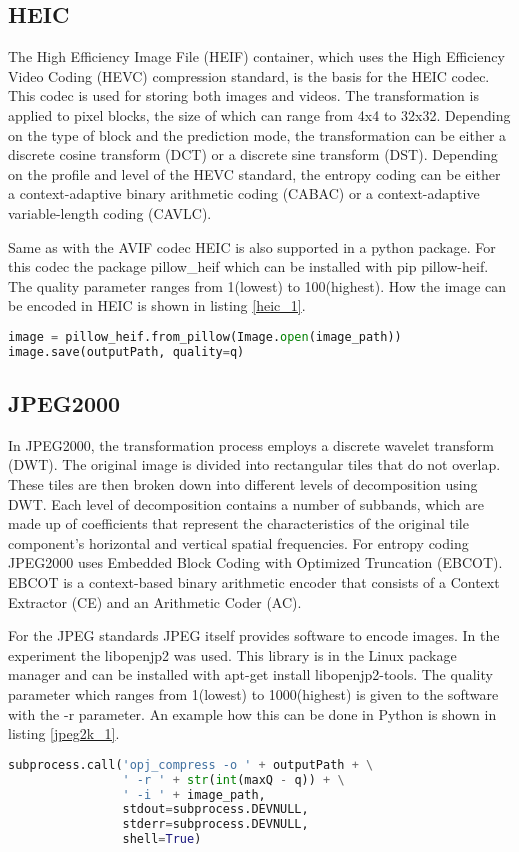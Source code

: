 \subsection{HEIC}
The High Efficiency Image File (HEIF) container, which uses the High Efficiency Video Coding (HEVC) compression standard, is the basis for the HEIC codec. This codec is used for storing both images and videos.
The transformation is applied to pixel blocks, the size of which can range from 4x4 to 32x32. Depending on the type of block and the prediction mode, the transformation can be either a discrete cosine transform (DCT) or a discrete sine transform (DST).
Depending on the profile and level of the HEVC standard, the entropy coding can be either a context-adaptive binary arithmetic coding (CABAC) or a context-adaptive variable-length coding (CAVLC).

Same as with the AVIF codec HEIC is also supported in a python package. For this codec the package pillow\_heif which can be installed with pip pillow-heif. The quality parameter ranges from 1(lowest) to 100(highest).
How the image can be encoded in HEIC is shown in listing \ref{heic_1}.

\begin{lstlisting}[label={heic_1}, language=Python, caption=Encode HEIC]
image = pillow_heif.from_pillow(Image.open(image_path))
image.save(outputPath, quality=q)
\end{lstlisting}

\subsection{JPEG2000}
In JPEG2000, the transformation process employs a discrete wavelet transform (DWT). The original image is divided into rectangular tiles that do not overlap. These tiles are then broken down into different levels of decomposition using DWT. Each level of decomposition contains a number of subbands, which are made up of coefficients that represent the characteristics of the original tile component’s horizontal and vertical spatial frequencies.
For entropy coding JPEG2000 uses Embedded Block Coding with Optimized Truncation (EBCOT). EBCOT is a context-based binary arithmetic encoder that consists of a Context Extractor (CE) and an Arithmetic Coder (AC).

For the JPEG standards JPEG itself provides software to encode images. In the experiment the libopenjp2 was used. This library is in the Linux package manager and can be installed with apt-get install libopenjp2-tools. The quality parameter which ranges from 1(lowest) to 1000(highest) is given to the software with the -r parameter. An example how this can be done in Python is shown in listing \ref{jpeg2k_1}.
\begin{lstlisting}[label={jpeg2k_1}, language=Python, caption=Encode JPEG 2000]
subprocess.call('opj_compress -o ' + outputPath + \
                ' -r ' + str(int(maxQ - q)) + \
                ' -i ' + image_path,
                stdout=subprocess.DEVNULL,
                stderr=subprocess.DEVNULL,
                shell=True)
\end{lstlisting}

